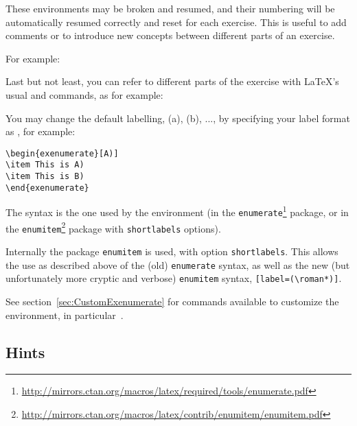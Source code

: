 \documentclass[11pt,a4paper]{article}
\begin{document}
These environments may be broken and resumed, and their numbering will be automatically
resumed correctly and reset for each exercise. This is useful to add comments or to
introduce new concepts between different parts of an exercise.

For example:
\begin{pkgverbatim}
%
\end{pkgverbatim}

Last but not least, you can refer to different parts of the exercise with \LaTeX's usual
 and 
commands, as for example:
\begin{pkgverbatim}
%
\end{pkgverbatim}

You may change the default labelling, (a), (b), ..., by specifying your label format as
, for example:
\begin{pkgverbatim}
\begin{verbatim}
\begin{exenumerate}[A)]
\item This is A)
\item This is B)
\end{exenumerate}
\end{verbatim}
\end{pkgverbatim}
The syntax is the one used by the  environment (in the
\texttt{enumerate}\footnote{\url{http://mirrors.ctan.org/macros/latex/required/tools/enumerate.pdf}}
package, or in the
\texttt{enumitem}\footnote{\url{http://mirrors.ctan.org/macros/latex/contrib/enumitem/enumitem.pdf}}
package with \texttt{shortlabels} options).

\begin{pkgtip}
  Internally the package \texttt{enumitem} is used, with option \texttt{shortlabels}. This
  allows the use as described above of the (old) \texttt{enumerate} syntax, as well as the
  new (but unfortunately more cryptic and verbose) \texttt{enumitem} syntax,
  \texttt{[label=(\textbackslash roman*)]}.

  See section~\ref{sec:CustomExenumerate} for commands available to customize the
   environment, in particular~.
\end{pkgtip}


\subsection{Hints}
\label{sec:Hints}
\end{document}
